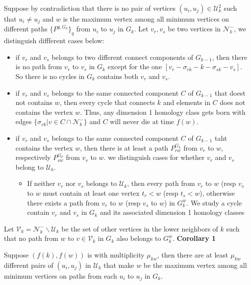 \documentclass[a4paper,12pt]{article}
\numberwithin{equation}{section}
\begin{document}
	Suppose by contradiction that there is no pair of vertices $(u_i, u_j) \in \mathcal{U}^2_k$ such that $u_i \neq u_j$ and $w$ is the maximum vertex among all minimum vertices on different paths $\{ P^{q,G_k} \}_q$ from $u_i$ to $u_j$ in $G_k$. Let $v_r,v_s$ be two vertices in $\mathcal{N}_k^-$, we distinguish diffferent cases below:
	\begin{itemize}
	 \item if $v_r$ and $v_s$ belongs to two different connect components of $G_{k-1}$, then there is no path from $v_r$ to $v_s$ in $G_{k}$ except for the one $ [v_r - \sigma_{rk} - k - \sigma_{sk} -v_s]$. So there is no cycles in $G_k$ contains both $v_r$ and $v_s$. 
	 \item if $v_r$ and $v_s$ belongs to the same connected component $C$ of $G_{k-1}$ that doest not contains $w$, then every cycle that connects $k$ and elements in $C$ does not contains the vertex $w$. Thus, any dimension 1 homology class gets born with edges $\{ \sigma_{vk}\vert v \in C \cap \mathcal{N}_k^- \}$ and $C$ will never die at time $f(w)$.
	 \item if $v_r$ and $v_s$ belongs to the same connected component $C$ of $G_{k-1}$ taht contains the vertex $w$, then there is at least a path $P^{G_k}_{rw}$ from $v_r$ to $w$, respectively $P_{sw}^{G_k}$ from $v_s$ to $w$. we distinguish cases for whether $v_r$ and $v_s$ belong to $\mathcal{U}_k$.
	    \begin{itemize}
	      \item If neither $v_r$ nor $v_s$ belongs to $\mathcal{U}_k$, then every path from $v_r$ to $w$ (resp $v_s$ to $w$ must contain at least one vertex $t_r < w$ (resp $t_s <w$), otherwise there exists a path from $v_r$ to $w$ (resp $v_s$ to $w$) in $G_k^w$.
	      We study a cycle contain $v_r$ and $v_s$ in $G_k$ and its associated dimension 1 homology classes 
	    \end{itemize}
	\end{itemize}

	
	
	
	Let $\mathcal{V}_k = \mathcal{N}_k^- \backslash \mathcal{U}_k$ be the set of other vertices in the lower neighbors of $k$ such that no path from $w$ to $v \in \mathcal{V}_k$ in $G_k$ also belongs to $G_k^w$.
	\noindent \textbf{Corollary 1}
	
	Suppose $(f(k), f(w))$ is with multiplicity $\mu_{kw}$, then there are at least $\mu_{kw}$ different pairs of $(u_i,u_j)$ in $\mathcal{U}_k$ that make $w$ be the maximum vertex among all minimum vertices on paths from each $u_i$ to $u_j$ in $G_k$.\\
	
\end{document}
